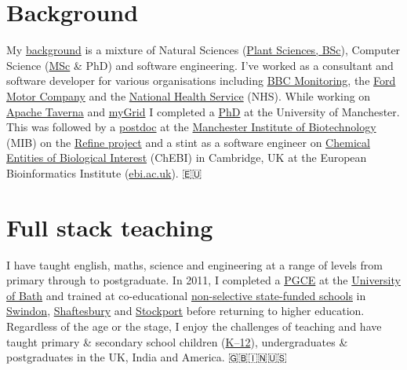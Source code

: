 \documentclass[12pt,]{book}
\begin{document}
\hypertarget{background}{%
\section*{Background}\label{background}}

My \href{https://uk.linkedin.com/in/duncanhull}{background} is a mixture of Natural Sciences (\href{http://www.plantsciences.manchester.ac.uk/}{Plant Sciences, BSc}), Computer Science (\href{http://www.cs.man.ac.uk/~hulld/msc2003.html}{MSc} \& PhD) and software engineering. I've worked as a consultant and software developer for various organisations including \href{https://en.wikipedia.org/wiki/BBC_Monitoring}{BBC Monitoring}, the \href{https://en.wikipedia.org/wiki/Ford_Motor_Company}{Ford Motor Company} and the \href{https://en.wikipedia.org/wiki/National_Health_Service}{National Health Service} (NHS). While working on \href{https://en.wikipedia.org/wiki/Apache_Taverna}{Apache Taverna} and \href{https://en.wikipedia.org/wiki/MyGrid}{myGrid} I completed a \href{https://ethos.bl.uk/OrderDetails.do?uin=uk.bl.ethos.497578}{PhD} at the University of Manchester. This was followed by a \href{https://en.wikipedia.org/wiki/Postdoctoral_researcher}{postdoc} at the \href{http://www.mib.ac.uk/}{Manchester Institute of Biotechnology} (MIB) on the \href{http://www.nactem.ac.uk/pathtext/}{Refine project} and a stint as a software engineer on \href{https://www.ebi.ac.uk/chebi/}{Chemical Entities of Biological Interest} (ChEBI) in Cambridge, UK at the European Bioinformatics Institute (\href{https://www.ebi.ac.uk}{ebi.ac.uk}). 🇪🇺

\hypertarget{full-stack-teaching}{%
\section*{Full stack teaching}\label{full-stack-teaching}}

I have taught english, maths, science and engineering at a range of levels from primary through to postgraduate. In 2011, I completed a \href{https://en.wikipedia.org/wiki/Postgraduate_Certificate_in_Education}{PGCE} at the \href{https://www.bath.ac.uk/}{University of Bath} and trained at co-educational \href{https://en.wikipedia.org/wiki/State-funded_schools_(England)}{non-selective state-funded schools} in \href{https://www.lydiardparkacademy.org.uk/}{Swindon}, \href{https://shaftesburyschool.co.uk/}{Shaftesbury} and \href{https://www.st-annes.stockport.sch.uk/}{Stockport} before returning to higher education. Regardless of the age or the stage, I enjoy the challenges of teaching and have taught primary \& secondary school children (\href{https://en.wikipedia.org/wiki/K\%E2\%80\%9312}{K--12}), undergraduates \& postgraduates in the UK, India and America. 🇬🇧🇮🇳🇺🇸
\end{document}
